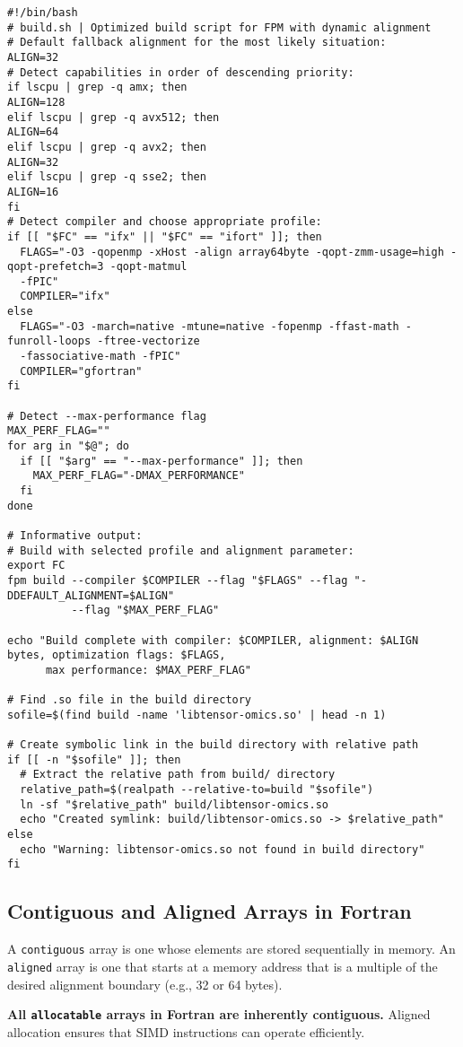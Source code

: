 \documentclass{article}
\begin{document}
\begin{verbatim}
#!/bin/bash
# build.sh | Optimized build script for FPM with dynamic alignment
# Default fallback alignment for the most likely situation:
ALIGN=32
# Detect capabilities in order of descending priority:
if lscpu | grep -q amx; then
ALIGN=128
elif lscpu | grep -q avx512; then
ALIGN=64
elif lscpu | grep -q avx2; then
ALIGN=32
elif lscpu | grep -q sse2; then
ALIGN=16
fi
# Detect compiler and choose appropriate profile:
if [[ "$FC" == "ifx" || "$FC" == "ifort" ]]; then
  FLAGS="-O3 -qopenmp -xHost -align array64byte -qopt-zmm-usage=high -qopt-prefetch=3 -qopt-matmul 
  -fPIC"
  COMPILER="ifx"
else
  FLAGS="-O3 -march=native -mtune=native -fopenmp -ffast-math -funroll-loops -ftree-vectorize 
  -fassociative-math -fPIC"
  COMPILER="gfortran"
fi

# Detect --max-performance flag
MAX_PERF_FLAG=""
for arg in "$@"; do
  if [[ "$arg" == "--max-performance" ]]; then
    MAX_PERF_FLAG="-DMAX_PERFORMANCE"
  fi
done

# Informative output:
# Build with selected profile and alignment parameter:
export FC
fpm build --compiler $COMPILER --flag "$FLAGS" --flag "-DDEFAULT_ALIGNMENT=$ALIGN" 
          --flag "$MAX_PERF_FLAG"

echo "Build complete with compiler: $COMPILER, alignment: $ALIGN bytes, optimization flags: $FLAGS, 
      max performance: $MAX_PERF_FLAG"

# Find .so file in the build directory
sofile=$(find build -name 'libtensor-omics.so' | head -n 1)

# Create symbolic link in the build directory with relative path
if [[ -n "$sofile" ]]; then
  # Extract the relative path from build/ directory
  relative_path=$(realpath --relative-to=build "$sofile")
  ln -sf "$relative_path" build/libtensor-omics.so
  echo "Created symlink: build/libtensor-omics.so -> $relative_path"
else
  echo "Warning: libtensor-omics.so not found in build directory"
fi
\end{verbatim}

\subsection{Contiguous and Aligned Arrays in Fortran}
A \texttt{contiguous} array is one whose elements are stored sequentially in memory. An \texttt{aligned} array is one that starts at a memory address that is a multiple of the desired alignment boundary (e.g., 32 or 64 bytes).

\textbf{All \texttt{allocatable} arrays in Fortran are inherently contiguous.} Aligned allocation ensures that SIMD instructions can operate efficiently.
\end{document}
